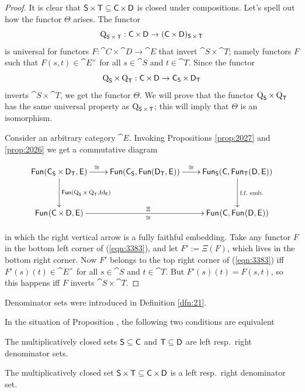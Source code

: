 \begin{proof}
It is clear that
$\operatorname{\mathsf{S}} \times \operatorname{\mathsf{T}} \subseteq \operatorname{\mathsf{C}} \times \operatorname{\mathsf{D}}$  
is closed under compositions. Let's spell out how the functor 
$\Theta$ arises. The functor
\[ \operatorname{Q}_{\operatorname{\mathsf{S}} \times \operatorname{\mathsf{T}}} : \operatorname{\mathsf{C}} \times \operatorname{\mathsf{D}} \to 
(\operatorname{\mathsf{C}} \times \operatorname{\mathsf{D}})_{\operatorname{\mathsf{S}} \times \operatorname{\mathsf{T}}} \]
is universal for functors 
$F : \cat{C} \times \cat{D} \to \cat{E}$
that invert $\cat{S} \times \cat{T}$; namely functors $F$ such that 
$F(s, t) \in \cat{E}^{\times}$ for all $s \in \cat{S}$ and $t \in \cat{T}$.
Since the functor 
\[ \operatorname{Q}_{\operatorname{\mathsf{S}}} \times \operatorname{Q}_{\operatorname{\mathsf{T}}} : \operatorname{\mathsf{C}} \times \operatorname{\mathsf{D}} \to 
\operatorname{\mathsf{C}}_{\operatorname{\mathsf{S}}} \times \operatorname{\mathsf{D}}_{\operatorname{\mathsf{T}}} \]
inverts $\cat{S} \times \cat{T}$, we get the functor $\Theta$. We will prove 
that the functor $\operatorname{Q}_{\operatorname{\mathsf{S}}} \times \operatorname{Q}_{\operatorname{\mathsf{T}}}$ 
has the same universal property as $\operatorname{Q}_{\operatorname{\mathsf{S}} \times \operatorname{\mathsf{T}}}$; this 
will imply that $\Theta$ is an isomorphism. 

Consider an arbitrary category $\cat{E}$. 
Invoking Propositions \ref{prop:2027} and \ref{prop:2026} we get a commutative 
diagram 

\begin{equation} \label{eqn:3383}
\UseTips  \xymatrix @C=5ex @R=8ex {
\cat{Fun}(\cat{C}_{\cat{S}} \times \cat{D}_{\cat{T}}, \cat{E})
\ar[d]^{\cat{Fun}
(\opn{Q}_{\cat{S}} \times \opn{Q}_{\cat{T}}, \opn{Id}_{\cat{E}})}
\ar[r]^(0.44){\cong}
&
\cat{Fun}(\cat{C}_{\cat{S}}, \cat{Fun}(\cat{D}_{\cat{T}}, \cat{E})) 
\ar[r]^{\cong}
&
\cat{Fun}_{\cat{S}}(\cat{C}, \cat{Fun}_{\cat{T}}(\cat{D}, \cat{E}))
\ar[d]^{\tup{f.f.\ emb.}}
\\
\cat{Fun}_{}(\cat{C} \times \cat{D}, \cat{E})
\ar[rr]^{\Xi}_{\cong}
&
&
\cat{Fun}_{}(\cat{C}, \cat{Fun}_{}(\cat{D}, \cat{E}))
}
\end{equation}

\noindent in which the right vertical arrow is a fully faithful embedding. 
Take any functor $F$ in the bottom left corner of (\ref{eqn:3383}), 
and let $F' := \Xi(F)$, which lives in the bottom right corner. 
Now $F'$ belongs to the top right corner of (\ref{eqn:3383})
iff $F'(s)(t) \in \cat{E}^{\times}$ for all $s \in \cat{S}$ and $t \in \cat{T}$.
But $F'(s)(t) = F(s, t)$, so this happens iff $F$ inverts 
$\cat{S} \times \cat{T}$.
\end{proof}

Denominator sets were introduced in Definition \ref{dfn:21}.

\begin{prop} \label{prop:2100}
In the situation of Proposition \tup{\ref{prop:2028}}, the following two 
conditions are equivalent\tup{:}
\begin{enumerate}
 The multiplicatively closed sets  
$\operatorname{\mathsf{S}} \subseteq \operatorname{\mathsf{C}}$ and $\operatorname{\mathsf{T}} \subseteq \operatorname{\mathsf{D}}$ are left \tup{(}resp.\ 
right\tup{)} denominator sets. 

 The multiplicatively closed set
$\operatorname{\mathsf{S}} \times \operatorname{\mathsf{T}} \subseteq \operatorname{\mathsf{C}} \times \operatorname{\mathsf{D}}$ is a left 
\tup{(}resp.\ right\tup{)} denominator set. 
\end{enumerate}
\end{prop}

